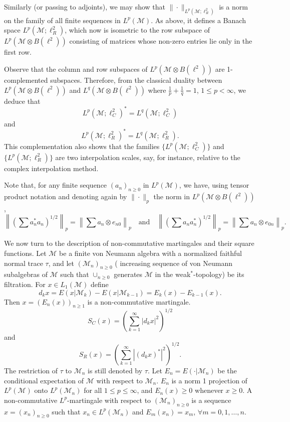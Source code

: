 \documentclass[reqno]{amsart}
\numberwithin{equation}{section}
\begin{document}
Similarly (or passing to adjoints), we may show that $\|\cdot\|_{L^p(\mathcal{M}; \ell^2_R)}$ is a norm on the family of all finite sequences in $L^p(\mathcal{M})$. As above, it defines a Banach space $L^p(\mathcal{M}; \ell^2_R)$, which now is isometric to the row subspace of $L^p(\mathcal{M} \otimes B(\ell^2))$ consisting of matrices whose non-zero entries lie only in the first row.

Observe that the column and row subspaces of $L^p(\mathcal{M} \otimes B(\ell^2))$ are 1-complemented subspaces. Therefore, from the classical duality between $L^p(\mathcal{M} \otimes B(\ell^2))$ and $L^q(\mathcal{M} \otimes B(\ell^2))$ where $\frac{1}{p} + \frac{1}{q} = 1$, $1 \leq p < \infty$, we deduce that
$$L^p(\mathcal{M}; \ell^2_C)^* = L^q(\mathcal{M}; \ell^2_C)$$ and $$L^p(\mathcal{M}; \ell^2_R)^* = L^q(\mathcal{M}; \ell^2_R).$$ This complementation also shows that the families $\{L^p(\mathcal{M}; \ell^2_C)\}$ and $\{L^p(\mathcal{M}; \ell^2_R)\}$ are two interpolation scales, say, for instance, relative to the complex interpolation method.

Note that, for any finite sequence $(a_n)_{n \geq 0}$ in $L^p(\mathcal{M})$, we have, using tensor product notation and denoting again by $\|\cdot\|_p$ the norm in $L^p(\mathcal{M} \otimes B(\ell^2))$,
\[
\left\|\left(\sum a_n^* a_n\right)^{1/2}\right\|_p = \left\|\sum a_n \otimes e_{n0}\right\|_p \quad \text{and} \quad \left\|\left(\sum a_n a_n^*\right)^{1/2}\right\|_p = \left\|\sum a_n \otimes e_{0n}\right\|_p.
\]



We now turn to the description of non-commutative martingales and their square
functions. Let $\mathcal{M}$ be a finite von Neumann algebra with a normalized faithful normal trace $\tau$, and let $(\mathcal{M}_n)_{n\ge0}$ ( increasing sequence of von Neumann subalgebras of $\mathcal{M}$ such that $\cup_{n\ge0}$ generates $\mathcal{M}$ in the weak$^*$-topology) be its filtration. For $x\in L_1(\mathcal{M})$ define
$$d_kx=E(x|\mathcal{M}_k)-E(x|\mathcal{M}_{k-1})=E_k(x)-E_{k-1}(x).$$
Then $x=(E_n(x))_{n\ge1}$ is a non-commutative martingale.
$$S_C(x)=\left(\sum_{k=1}^\infty |d_kx|^2\right)^{1/2}$$
and 
$$S_R(x)=\left(\sum_{k=1}^\infty |(d_kx)^*|^2\right)^{1/2}.$$
The restriction of $\tau$ to $\mathcal{M}_n$ is still denoted by $\tau$. Let $E_n = E(\cdot | \mathcal{M}_n)$ be the conditional expectation of $\mathcal{M}$ with respect to $\mathcal{M}_n$. $E_n$ is a norm 1 projection of $L^p(\mathcal{M})$ onto $L^p(\mathcal{M}_n)$ for all $1 \leq p \leq \infty$, and $E_n(x) \geq 0$ whenever $x \geq 0$. A non-commutative $L^p$-martingale with respect to $(\mathcal{M}_n)_{n \geq 0}$ is a sequence $x = (x_n)_{n \geq 0}$ such that $x_n \in L^p(\mathcal{M}_n)$ and $E_m(x_n) = x_m$, $\forall m = 0, 1, \ldots, n.$
\end{document}
